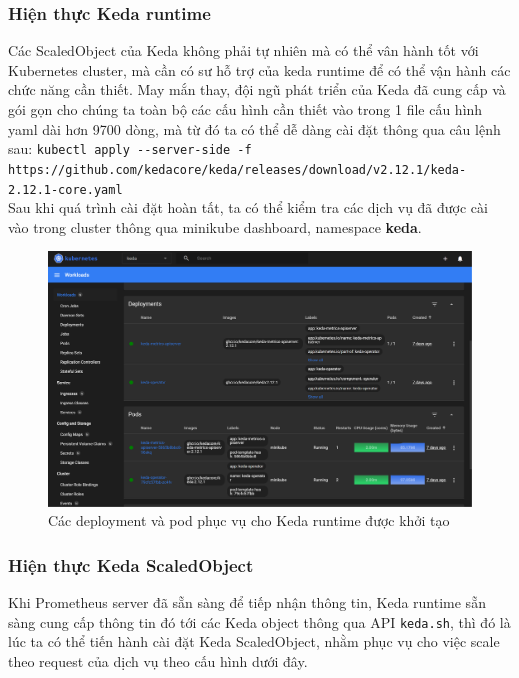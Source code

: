 \subsubsection{Hiện thực Keda runtime}
\noindent Các ScaledObject của Keda không phải tự nhiên mà có thể vân hành tốt với Kubernetes cluster, mà cần có sư hỗ trợ của keda runtime để có thể vận hành các chức năng cần thiết. May mắn thay, đội ngũ phát triển của Keda đã cung cấp và gói gọn cho chúng ta toàn bộ các cấu hình cần thiết vào trong 1 file cấu hình yaml dài hơn 9700 dòng, mà từ đó ta có thể dễ dàng cài đặt thông qua câu lệnh sau: \lstinline|kubectl apply --server-side -f https://|\lstinline|github.com/kedacore/keda/releases/download/v2.12.1/keda-2.12.1-core.yaml|\\[0.2cm]
Sau khi quá trình cài đặt hoàn tất, ta có thể kiểm tra các dịch vụ đã được cài vào trong cluster thông qua minikube dashboard, namespace \textbf{keda}.
\begin{figure}[H]
  \begin{center}
    \includegraphics[scale=0.4]{images/hanh/keda-deployment.png}
    \caption{Các deployment và pod phục vụ cho Keda runtime được khởi tạo}
  \end{center}
  \label{}
\end{figure}

\subsubsection{Hiện thực Keda ScaledObject}
\noindent Khi Prometheus server đã sẵn sàng để tiếp nhận thông tin, Keda runtime sẵn sàng cung cấp thông tin đó tới các Keda object thông qua API \lstinline|keda.sh|, thì đó là lúc ta có thể tiến hành cài đặt Keda ScaledObject, nhằm phục vụ cho việc scale theo request của dịch vụ theo cấu hình dưới đây.

